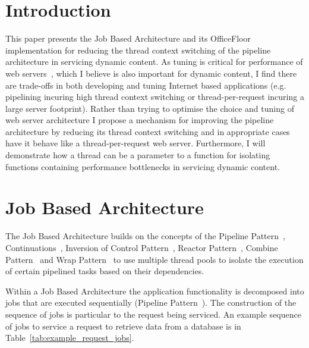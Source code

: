 \documentclass[conference]{ieee/IEEEtran}
\begin{document}
%
\IEEEpeerreviewmaketitle



\section{Introduction}
This paper presents the Job Based Architecture and its OfficeFloor
implementation for reducing the thread context switching of the pipeline
architecture in servicing dynamic content.  As tuning is critical for
performance of web servers~\cite{tuning-important,tuning-os-important}, which I
believe is also important for dynamic content, I find there are trade-offs in
both developing and tuning Internet based applications (e.g. pipelining incuring
high thread context switching or thread-per-request incuring a large server
footprint).  Rather than trying to optimise the choice and tuning of web server
architecture I propose a mechanism for improving the pipeline architecture by
reducing its thread context switching and in appropriate cases have it behave
like a thread-per-request web server.  Furthermore, I will demonstrate how a
thread can be a parameter to a function for isolating functions containing
performance bottlenecks in servicing dynamic content.


\section{Job Based Architecture}
The Job Based Architecture builds on the concepts of the Pipeline
Pattern~\cite{pipeline}, Continuations~\cite{continuations}, Inversion of
Control Pattern~\cite{ioc}, Reactor Pattern~\cite{reactor}, Combine
Pattern~\cite{pipeline} and Wrap Pattern~\cite{pipeline} to use multiple thread
pools to isolate the execution of certain pipelined tasks based on their
dependencies.

Within a Job Based Architecture the application functionality is decomposed into
jobs that are executed sequentially (Pipeline Pattern~\cite{pipeline}).  The
construction of the sequence of jobs is particular to the request being
serviced.  An example sequence of jobs to service a request to retrieve data
from a database is in Table~\ref{tab:example_request_jobs}.
\end{document}
